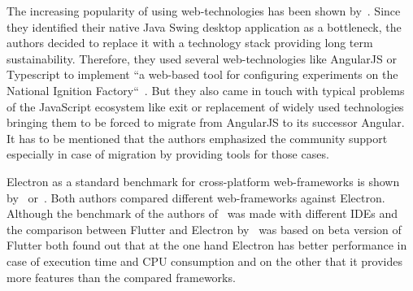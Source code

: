 The increasing popularity of using web-technologies has been shown by~\cite{pernice:icalepcs2019-wempr006}.
Since they identified their native Java Swing desktop application as a bottleneck, the authors decided to replace it with a technology stack providing long term sustainability.
Therefore, they used several web-technologies like AngularJS or Typescript to implement ``a web-based tool for configuring experiments on the National Ignition Factory``~\cite{pernice:icalepcs2019-wempr006}.
But they also came in touch with typical problems of the JavaScript ecosystem like exit or replacement of widely used technologies bringing them to be forced to migrate from
AngularJS to its successor Angular.
It has to be mentioned that the authors emphasized the community support especially in case of migration by providing tools for those cases.

Electron as a standard benchmark for cross-platform web-frameworks is shown by~\cite{electron-javafx} or~\cite{flutter}.
Both authors compared different web-frameworks against Electron.
Although the benchmark of the authors of~\cite{electron-javafx} was made with different \ac{IDE}s and the comparison between Flutter and Electron by~\cite{flutter} was based on beta version of Flutter
both found out that at the one hand Electron has better performance in case of execution time and CPU consumption and on the other that it provides more features than the compared frameworks.

